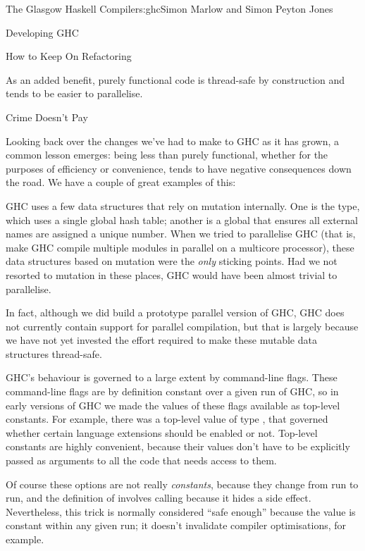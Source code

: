 \begin{aosachapter}{The Glasgow Haskell Compiler}{s:ghc}{Simon Marlow and Simon Peyton Jones}
\begin{aosasect1}{Developing GHC}
\begin{aosasect2}{How to Keep On Refactoring}
\begin{aosaitemize}
  As an added benefit, purely functional code is thread-safe by
  construction and tends to be easier to parallelise.

\end{aosaitemize}

\end{aosasect2}

\begin{aosasect2}{Crime Doesn't Pay}

Looking back over the changes we've had to make to GHC as it has
grown, a common lesson emerges: being less than purely functional,
whether for the purposes of efficiency or convenience, tends to have
negative consequences down the road.  We have a couple of great
examples of this:

\begin{aosaitemize}

\item GHC uses a few data structures that rely on mutation internally.
  One is the  type, which uses a single global hash
  table; another is a global  that ensures all
  external names are assigned a unique number.  When we tried to
  parallelise GHC (that is, make GHC compile multiple modules in
  parallel on a multicore processor), these data structures based on
  mutation were the \emph{only} sticking points.  Had we not resorted
  to mutation in these places, GHC would have been almost trivial to
  parallelise.

  In fact, although we did build a prototype parallel version of GHC,
  GHC does not currently contain support for parallel compilation, but
  that is largely because we have not yet invested the effort required
  to make these mutable data structures thread-safe.

\item GHC's behaviour is governed to a large extent by command-line
  flags.  These command-line flags are by definition constant over a
  given run of GHC, so in early versions of GHC we made the values of
  these flags available as top-level constants. For example, there was
  a top-level value  of type , that
  governed whether certain language extensions should be enabled or
  not.  Top-level constants are highly convenient, because their
  values don't have to be explicitly passed as arguments to all the
  code that needs access to them.

  Of course these options are not really \emph{constants}, because
  they change from run to run, and the definition of
   involves calling 
  because it hides a side effect.  Nevertheless, this trick is
  normally considered ``safe enough'' because the value is constant
  within any given run; it doesn't invalidate compiler optimisations,
  for example.


\end{aosaitemize}
\end{aosasect2}
\end{aosasect1}
\end{aosachapter}

